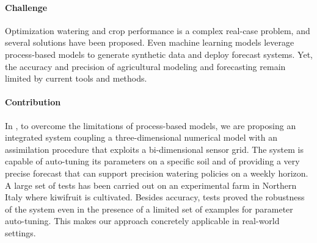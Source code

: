 \paragraph{Challenge}
Optimization watering and crop performance is a complex real-case problem, and several solutions have been proposed.
Even machine learning models leverage process-based models to generate synthetic data and deploy forecast systems.
Yet, the accuracy and precision of agricultural modeling and forecasting remain limited by current tools and methods.

\paragraph{Contribution} In , to overcome the limitations of process-based models, we are proposing an integrated system coupling a three-dimensional numerical model with an assimilation procedure that exploits a bi-dimensional sensor grid.
The system is capable of auto-tuning its parameters on a specific soil and of providing a very precise forecast that can support precision watering policies on a weekly horizon.
A large set of tests has been carried out on an experimental farm in Northern Italy where kiwifruit is cultivated.
Besides accuracy, tests proved the robustness of the system even in the presence of a limited set of examples for parameter auto-tuning.
This makes our approach concretely applicable in real-world settings.






